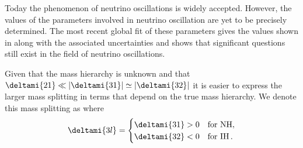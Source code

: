 
Today the phenomenon of neutrino oscillations is widely accepted. 
However, the values of the parameters involved in neutrino oscillation are yet to be precisely determined.
The most recent global fit of these parameters gives the values shown in  along with the associated uncertainties and shows that significant questions still exist in the field of neutrino oscillations.

Given that the mass hierarchy is unknown and that $\deltami{21} \ll |\deltami{31}| \simeq |\deltami{32}|$ it is easier to express the larger mass splitting in terms that depend on the true mass hierarchy.
We denote this mass splitting as  where
\begin{equation}
  \deltami{3l} =
  \begin{cases}
    \deltami{31} > 0 & \text{for NH} , \\
    \deltami{32} < 0 & \text{for IH} \, .
  \end{cases}
\end{equation}

